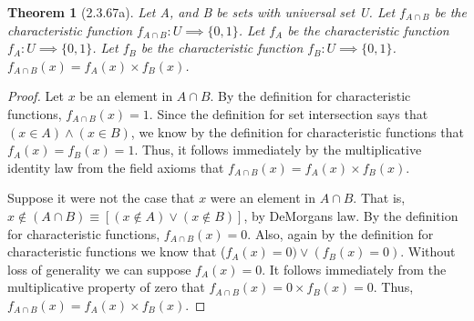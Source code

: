 \documentclass[a4paper, 12pt]{article}
\theoremstyle{plain}
\newtheorem*{theorem*}{Theorem}
\begin{document}
	
	\begin{theorem*}[2.3.67a]
		Let A, and B be sets with universal set U. Let $f_{A \cap B}$ be the characteristic function $f_{A \cap B}: U \implies \{0, 1\}$. Let $f_{A}$ be the characteristic function $f_{A}: U \implies \{0, 1\}$. Let $f_{B}$ be the characteristic function \newline $f_{B}: U \implies \{0, 1\}$. $f_{A \cap B}(x) = f_{A}(x) \times f_{B}(x)$.
	\end{theorem*}
	
	\begin{proof}
		Let $x$ be an element in $A \cap B$. By the definition for characteristic functions, $f_{A \cap B}(x) = 1$. Since the definition for set intersection says that \newline $(x \in A) \land (x \in B)$, we know by the definition for characteristic functions that $f_{A}(x) = f_{B}(x) = 1$. Thus, it follows immediately by the multiplicative identity law from the field axioms that $f_{A \cap B}(x) = f_{A}(x) \times f_{B}(x)$.
		
		Suppose it were not the case that $x$ were an element in $A \cap B$. That is, $x \notin (A \cap B) \equiv [(x \notin A) \lor (x \notin B)]$, by DeMorgans law. By the definition for characteristic functions, $f_{A \cap B}(x) = 0$. Also, again by the definition for characteristic functions we know that ($f_{A}(x) = 0) \lor (f_{B}(x) = 0)$. Without loss of generality we can suppose $f_{A}(x) = 0$. It follows immediately from the multiplicative property of zero that $f_{A \cap B}(x) = 0 \times f_{B}(x) = 0$. Thus, $f_{A \cap B}(x) = f_{A}(x) \times f_{B}(x)$.
	\end{proof}
\end{document}
